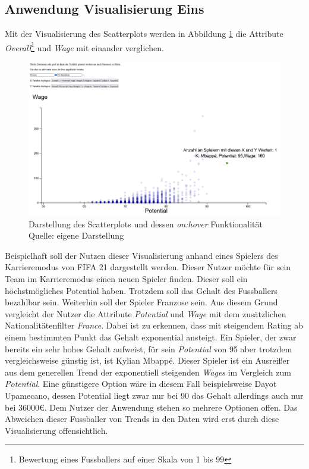 \documentclass[usegeometry=true]{scrartcl}
\begin{document}
\subsection{Anwendung Visualisierung Eins}
Mit der Visualisierung des Scatterplots werden in Abbildung \ref{SP5} die Attribute \textit{Overall}\footnote{Bewertung eines Fussballers auf einer Skala von 1 bis 99} und \textit{Wage} mit einander verglichen.
\begin{figure}[h!]
\centering
\includegraphics[scale=0.5]{grafiken/Scatterplot5}
\caption{Darstellung des Scatterplots und dessen \textit{on:hover} Funktionalität\\ Quelle: eigene Darstellung}
\label{SP5}
\end{figure}
Beispielhaft soll der Nutzen dieser Visualisierung anhand eines Spielers des Karrieremodus von FIFA 21 dargestellt werden.
Dieser Nutzer möchte für sein Team im Karrieremodus einen neuen Spieler finden. Dieser soll ein höchstmögliches Potential haben. Trotzdem soll das Gehalt des Fussballers bezahlbar sein. Weiterhin soll der Spieler Franzose sein. Aus diesem Grund vergleicht der Nutzer die Attribute \textit{Potential} und \textit{Wage} mit dem zusätzlichen Nationalitätenfilter \textit{France}. Dabei ist zu erkennen, dass mit steigendem Rating ab einem bestimmten Punkt das Gehalt exponential ansteigt. Ein Spieler, der zwar bereits ein sehr hohes Gehalt aufweist, für sein \textit{Potential} von 95 aber trotzdem vergleichsweise günstig ist, ist Kylian Mbappé. Dieser Spieler ist ein Ausreißer aus dem generellen Trend der exponentiell steigenden \textit{Wages} im Vergleich zum \textit{Potential}. Eine günstigere Option wäre in diesem Fall beispielsweise Dayot Upamecano, dessen Potential liegt zwar nur bei 90 das Gehalt allerdings auch nur bei 36000€. Dem Nutzer der Anwendung stehen so mehrere Optionen offen. Das Abweichen dieser Fussballer von Trends in den Daten wird erst durch diese Visualisierung offensichtlich.
\end{document}
